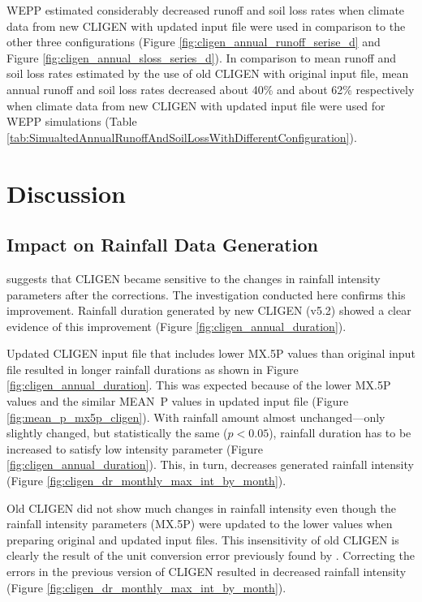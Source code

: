 WEPP estimated considerably decreased runoff and soil loss rates when climate
data from new CLIGEN with updated input file were used in comparison to the
other three configurations (Figure \ref{fig:cligen_annual_runoff_serise_d} and
Figure \ref{fig:cligen_annual_sloss_series_d}). In comparison to mean runoff and
soil loss rates estimated by the use of old CLIGEN with original input file,
mean annual runoff and soil loss rates decreased about 40\% and about 62\%
respectively when climate data from new CLIGEN with updated input file were used
for WEPP simulations (Table
\ref{tab:SimualtedAnnualRunoffAndSoilLossWithDifferentConfiguration}).

\section{Discussion}
\label{sec:ImprovedCLIGENDiscussion}

\subsection{Impact on Rainfall Data Generation}

\citet{yu2000-301} suggests that CLIGEN became sensitive to the changes in
rainfall intensity parameters after the corrections. The investigation conducted
here confirms this improvement. Rainfall duration generated by new CLIGEN (v5.2)
showed a clear evidence of this improvement (Figure
\ref{fig:cligen_annual_duration}).

Updated CLIGEN input file that includes lower {MX.5P} values than original input
file resulted in longer rainfall durations as shown in Figure
\ref{fig:cligen_annual_duration}. This was expected because of the lower {MX.5P}
values and the similar MEAN~P values in updated input file (Figure
\ref{fig:mean_p_mx5p_cligen}). With rainfall amount almost unchanged---only
slightly changed, but statistically the same ($p<0.05$), rainfall duration has
to be increased to satisfy low intensity parameter (Figure
\ref{fig:cligen_annual_duration}). This, in turn, decreases generated rainfall
intensity (Figure \ref{fig:cligen_dr_monthly_max_int_by_month}).

Old CLIGEN did not show much changes in rainfall intensity even though the
rainfall intensity parameters ({MX.5P}) were updated to the lower values when
preparing original and updated input files. This insensitivity of old CLIGEN is
clearly the result of the unit conversion error previously found by
\citet{yu2000-301}. Correcting the errors in the previous version of CLIGEN
resulted in decreased rainfall intensity (Figure
\ref{fig:cligen_dr_monthly_max_int_by_month}).


